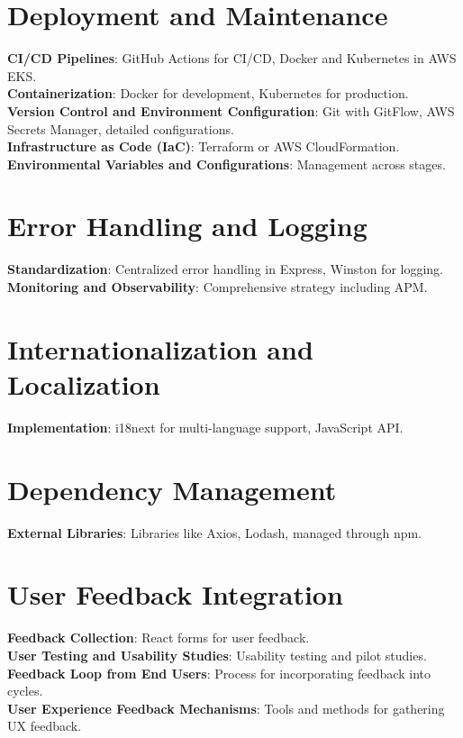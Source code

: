 \documentclass[a4paper,12pt]{article}
\begin{document}
	\section*{Deployment and Maintenance}
	\textbf{CI/CD Pipelines}: GitHub Actions for CI/CD, Docker and Kubernetes in AWS EKS. \\
	\textbf{Containerization}: Docker for development, Kubernetes for production. \\
	\textbf{Version Control and Environment Configuration}: Git with GitFlow, AWS Secrets Manager, detailed configurations. \\
	\textbf{Infrastructure as Code (IaC)}: Terraform or AWS CloudFormation. \\
	\textbf{Environmental Variables and Configurations}: Management across stages.
	
	\section*{Error Handling and Logging}
	\textbf{Standardization}: Centralized error handling in Express, Winston for logging. \\
	\textbf{Monitoring and Observability}: Comprehensive strategy including APM.
	
	\section*{Internationalization and Localization}
	\textbf{Implementation}: i18next for multi-language support, JavaScript API.
	
	\section*{Dependency Management}
	\textbf{External Libraries}: Libraries like Axios, Lodash, managed through npm.
	
	\section*{User Feedback Integration}
	\textbf{Feedback Collection}: React forms for user feedback. \\
	\textbf{User Testing and Usability Studies}: Usability testing and pilot studies. \\
	\textbf{Feedback Loop from End Users}: Process for incorporating feedback into cycles. \\
	\textbf{User Experience Feedback Mechanisms}: Tools and methods for gathering UX feedback.
	
\end{document}
